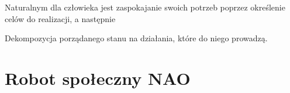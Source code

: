 Naturalnym dla człowieka jest zaspokajanie swoich potrzeb poprzez określenie celów do realizacji, a następnie 

Dekompozycja porządanego stanu na działania, które do niego prowadzą.



\section{Robot społeczny NAO}
